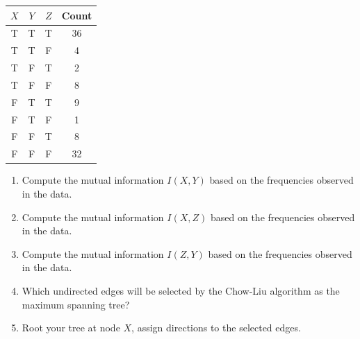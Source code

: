\documentclass[a4paper]{article}
\theoremstyle{definition}
\begin{document}
\begin{table}[H]
        \centering
                \begin{tabular}{cccc}
                           $X$ & $Y$ & $Z$ & Count \\
                                \hline
                                T & T & T & 36 \\
                                \hline
                                T & T & F & 4 \\
                                \hline
                                T & F & T & 2 \\
                                \hline
                                T & F & F & 8 \\
                                \hline
                                F & T & T & 9 \\
                                \hline
                                F & T & F & 1 \\
                                \hline
                                F & F & T & 8 \\
                                \hline
                                F & F & F & 32 \\
                                \hline
                \end{tabular}
\end{table}

\begin{enumerate}
\item Compute the mutual information $I(X, Y)$ based on the frequencies observed in the data.
\item Compute the mutual information $I(X, Z)$ based on the frequencies observed in the data.
\item Compute the mutual information $I(Z, Y)$ based on the frequencies observed in the data.
\item Which undirected edges will be selected by the Chow-Liu algorithm as the maximum spanning tree?
\item Root your tree at node $X$, assign directions to the selected edges.
\end{enumerate}
\end{document}
